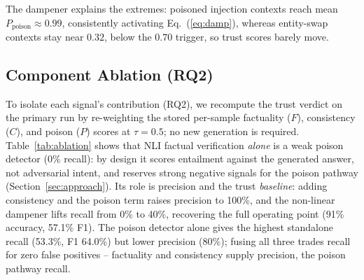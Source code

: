 
The dampener explains the extremes: poisoned injection contexts reach mean $P_{\text{poison}}\approx0.99$, consistently activating Eq.~(\ref{eq:damp}), whereas entity-swap contexts stay near $0.32$, below the $0.70$ trigger, so trust scores barely move.


\subsection{Component Ablation (RQ2)}
\label{sec:ablation}
To isolate each signal's contribution (RQ2), we recompute the trust verdict on the primary run by re-weighting the stored per-sample factuality ($F$), consistency ($C$), and poison ($P$) scores at $\tau{=}0.5$; no new generation is required. Table~\ref{tab:ablation} shows that NLI factual verification \emph{alone} is a weak poison detector (0\% recall): by design it scores entailment against the generated answer, not adversarial intent, and reserves strong negative signals for the poison pathway (Section~\ref{sec:approach}). Its role is precision and the trust \emph{baseline}: adding consistency and the poison term raises precision to 100\%, and the non-linear dampener lifts recall from 0\% to 40\%, recovering the full operating point (91\% accuracy, 57.1\% F1). The poison detector alone gives the highest standalone recall (53.3\%, F1 64.0\%) but lower precision (80\%); fusing all three trades recall for zero false positives -- factuality and consistency supply precision, the poison pathway recall.



